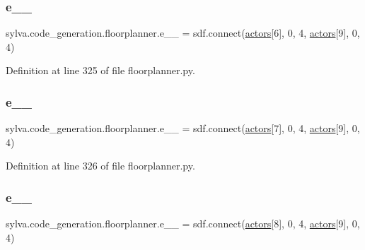 \subsubsection{\texorpdfstring{e\+\_\+\_}{e\_6\_9}}
{\footnotesize\ttfamily sylva.\+code\+\_\+generation.\+floorplanner.\+e\+\_\+\_ = sdf.\+connect(\hyperlink{namespacesylva_1_1code__generation_1_1floorplanner_a0a7a26c9bd92be126f3b70c232ba81cd}{actors}\mbox{[}6\mbox{]}, 0, 4, \hyperlink{namespacesylva_1_1code__generation_1_1floorplanner_a0a7a26c9bd92be126f3b70c232ba81cd}{actors}\mbox{[}9\mbox{]}, 0, 4)}



Definition at line 325 of file floorplanner.\+py.

\mbox{\label{namespacesylva_1_1code__generation_1_1floorplanner_af611d810278e052160072892d0fd3a9a}} 
\subsubsection{\texorpdfstring{e\+\_\+\_}{e\_7\_9}}
{\footnotesize\ttfamily sylva.\+code\+\_\+generation.\+floorplanner.\+e\+\_\+\_ = sdf.\+connect(\hyperlink{namespacesylva_1_1code__generation_1_1floorplanner_a0a7a26c9bd92be126f3b70c232ba81cd}{actors}\mbox{[}7\mbox{]}, 0, 4, \hyperlink{namespacesylva_1_1code__generation_1_1floorplanner_a0a7a26c9bd92be126f3b70c232ba81cd}{actors}\mbox{[}9\mbox{]}, 0, 4)}



Definition at line 326 of file floorplanner.\+py.

\mbox{\label{namespacesylva_1_1code__generation_1_1floorplanner_aa680e680b0de0a966b6d5b32ed00f49e}} 
\subsubsection{\texorpdfstring{e\+\_\+\_}{e\_8\_9}}
{\footnotesize\ttfamily sylva.\+code\+\_\+generation.\+floorplanner.\+e\+\_\+\_ = sdf.\+connect(\hyperlink{namespacesylva_1_1code__generation_1_1floorplanner_a0a7a26c9bd92be126f3b70c232ba81cd}{actors}\mbox{[}8\mbox{]}, 0, 4, \hyperlink{namespacesylva_1_1code__generation_1_1floorplanner_a0a7a26c9bd92be126f3b70c232ba81cd}{actors}\mbox{[}9\mbox{]}, 0, 4)}




